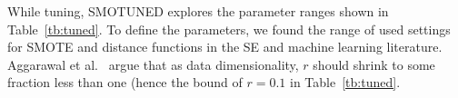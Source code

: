 \documentclass[10pt,conference]{IEEEtran}
\theoremstyle{break}
\theoremstyle{break}
\begin{document}
 While tuning, SMOTUNED explores 
the parameter ranges shown  in  Table~\ref{tb:tuned}. To define
the parameters, we found the range of used settings for SMOTE and distance functions
in the   SE and machine learning  literature.  Aggarawal et al.~\cite{aggarwal2001surprising}
argue that as data dimensionality, $r$ should shrink to some fraction less than one
(hence the bound of $r=0.1$ in Table~\ref{tb:tuned}. 



\end{document}
